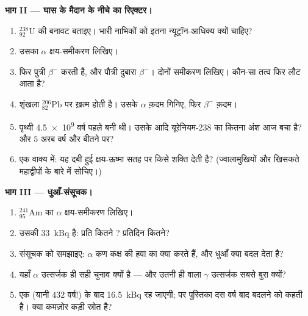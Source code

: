 \begin{problem}[{सप्ताहांत समस्या --- अस्थिर नाभिक के तीन पेशे: आधी होती
गिनतियों से आँकी गई एक ममी, यूरेनियम का संतुलित वंश-वृक्ष, एक धुआँ-संसूचक का
लेखा, और यह कि तारों का नश्वर होना क्यों ज़रूरी था}]
\medskip
\noindent\textbf{भाग II --- घास के मैदान के नीचे का रिएक्टर।}
\begin{enumerate}[resume]
  \item ${}^{238}_{92}\mathrm{U}$ की बनावट बताइए। भारी नाभिकों को इतना न्यूट्रॉन-आधिक्य क्यों
        चाहिए?
  \item उसका $\alpha$ क्षय-समीकरण लिखिए।
  \item फिर पुत्री $\beta^-$  करती है, और पौत्री दुबारा $\beta^-$। दोनों
        समीकरण लिखिए। कौन-सा तत्व फिर लौट आता है?
  \item शृंखला ${}^{206}_{82}\mathrm{Pb}$ पर ख़त्म होती है। उसके $\alpha$ क़दम गिनिए, फिर
        $\beta^-$ क़दम।
  \item पृथ्वी \num{4.5e9} वर्ष पहले बनी थी। उसके आदि यूरेनियम-238 का कितना अंश
        आज बचा है? और $5$ अरब वर्ष और बीतने पर?
  \item एक वाक्य में: यह दबी हुई क्षय-ऊष्मा सतह पर किसे शक्ति देती
        है? (ज्वालामुखियों और खिसकते महाद्वीपों के बारे में सोचिए।)
\end{enumerate}

\medskip
\noindent\textbf{भाग III --- धुआँ-संसूचक।}
\begin{enumerate}[resume]
  \item ${}^{241}_{95}\mathrm{Am}$ का $\alpha$ क्षय-समीकरण लिखिए।
  \item उसकी  \qty{33}{kBq} है: प्रति  कितने ? प्रतिदिन
        कितने?
  \item संसूचक को समझाइए: $\alpha$ कण कक्ष की हवा का क्या करते हैं, और धुआँ
        क्या बदल देता है?
  \item यहाँ $\alpha$ उत्सर्जक ही सही चुनाव क्यों है --- और उतनी ही
         वाला $\gamma$ उत्सर्जक सबसे बुरा क्यों?
  \item एक  (यानी $432$ वर्ष!) के बाद 
        \qty{16.5}{kBq} रह जाएगी; पर पुस्तिका दस वर्ष बाद बदलने को कहती है। क्या
        कमज़ोर कड़ी स्रोत है?
\end{enumerate}


\end{problem}
